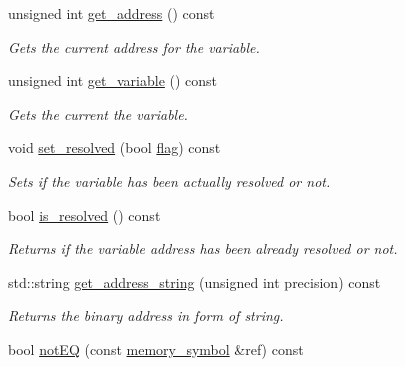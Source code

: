 \begin{DoxyCompactItemize}
unsigned int \hyperlink{classmemory__symbol_af3ad921a30142ebbc1c1628f5cdab6a0}{get\+\_\+address} () const
\begin{DoxyCompactList}\small\item\em Gets the current address for the variable. \end{DoxyCompactList}\item 
unsigned int \hyperlink{classmemory__symbol_acd591fc85268b87620330ad55c7d9699}{get\+\_\+variable} () const
\begin{DoxyCompactList}\small\item\em Gets the current the variable. \end{DoxyCompactList}\item 
void \hyperlink{classmemory__symbol_a24ab8c8ca79289e4ccd4f9226f0ce17c}{set\+\_\+resolved} (bool \hyperlink{tutorial__fpl__2017_2lab2_2materials_22_86_2SPARC-GCC_8h_a28a1ef2372a94a558be91f61912bc371}{flag}) const
\begin{DoxyCompactList}\small\item\em Sets if the variable has been actually resolved or not. \end{DoxyCompactList}\item 
bool \hyperlink{classmemory__symbol_ad7fee9476d1609516c62f687d544320d}{is\+\_\+resolved} () const
\begin{DoxyCompactList}\small\item\em Returns if the variable address has been already resolved or not. \end{DoxyCompactList}\item 
std\+::string \hyperlink{classmemory__symbol_ac1ec379fc8366abbeea5bebf3c467cfd}{get\+\_\+address\+\_\+string} (unsigned int precision) const
\begin{DoxyCompactList}\small\item\em Returns the binary address in form of string. \end{DoxyCompactList}\item 
bool \hyperlink{classmemory__symbol_a8d2289e9c5890732a2d9f9147cbad101}{not\+EQ} (const \hyperlink{classmemory__symbol}{memory\+\_\+symbol} \&ref) const
\end{DoxyCompactItemize}
